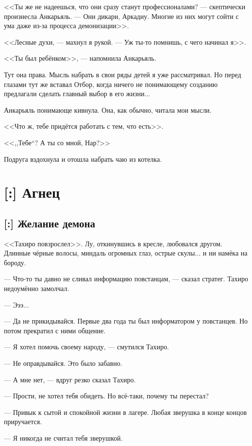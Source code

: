 <<Ты же не надеешься, что они сразу станут профессионалами? --- скептически произнесла Анкарьяль.
--- Они дикари, Аркадиу.
Многие из них могут сойти с ума даже из-за процесса демонизации>>.

<<Лесные духи, --- махнул я рукой.
--- Уж ты-то помнишь, с чего начинал я>>.

<<Ты был ребёнком>>, --- напомнила Анкарьяль.

Тут она права.
Мысль набрать в свои ряды детей я уже рассматривал.
Но перед глазами тут же вставал Отбор, когда ничего не понимающему созданию предлагали сделать главный выбор в его жизни...

Анкарьяль понимающе кивнула.
Она, как обычно, читала мои мысли.

<<Что ж, тебе придётся работать с тем, что есть>>.

<<,,Тебе``?
А ты со мной, Нар?>>

Подруга вздохнула и отошла набрать чаю из котелка.

\chapter{[:] Агнец}

\section{[:] Желание демона}

<<Тахиро повзрослел>>.
Лу, откинувшись в кресле, любовался другом.
Длинные чёрные волосы, миндаль огромных глаз, острые скулы... и ни намёка на бороду.

--- Что-то ты давно не сливал информацию повстанцам, --- сказал стратег.
Тахиро недоумённо замолчал.

--- Эээ...

--- Да не прикидывайся.
Первые два года ты был информатором у повстанцев.
Но потом прекратил с ними общение.

--- Я хотел помочь своему народу, --- смутился Тахиро.

--- Не оправдывайся.
Это было забавно.

--- А мне нет, --- вдруг резко сказал Тахиро.

--- Прости, не хотел тебя обидеть.
Но всё-таки, почему ты перестал?

--- Привык к сытой и спокойной жизни в лагере.
Любая зверушка в конце концов приручается.

--- Я никогда не считал тебя зверушкой.

